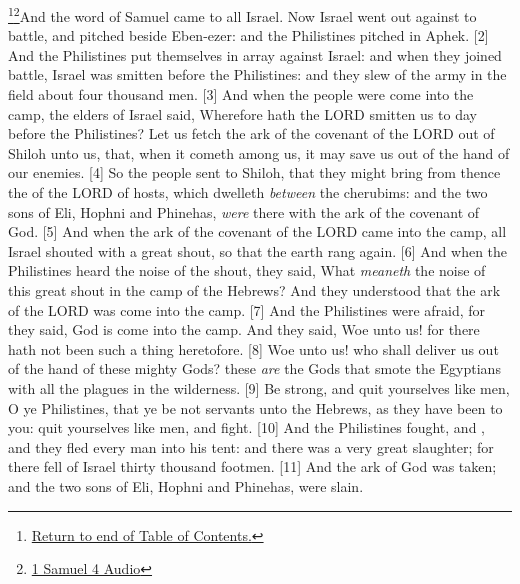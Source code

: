 \footnote{\textcolor[cmyk]{0.99998,1,0,0}{\hyperlink{TOC}{Return to end of Table of Contents.}}}\footnote{\href{https://audiobible.com/bible/1_samuel_4.html}{\textcolor[cmyk]{0.99998,1,0,0}{1 Samuel 4 Audio}}}\textcolor[cmyk]{0.99998,1,0,0}{And the word of Samuel came to all Israel. Now Israel went out against   to battle, and pitched beside Eben-ezer: and the Philistines pitched in Aphek.}
[2] \textcolor[cmyk]{0.99998,1,0,0}{And the Philistines put themselves in array against Israel: and when they joined battle, Israel was smitten before the Philistines: and they slew of the army in the field about four thousand men.}
[3] \textcolor[cmyk]{0.99998,1,0,0}{And when the people were come into the camp, the elders of Israel said, Wherefore hath the LORD smitten us to day before the Philistines? Let us fetch the ark of the covenant of the LORD out of Shiloh unto us, that, when it cometh among us, it may save us out of the hand of our enemies.}
[4] \textcolor[cmyk]{0.99998,1,0,0}{So the people sent to Shiloh, that they might bring from thence the  of the LORD of hosts, which dwelleth \emph{between} the cherubims: and the two sons of Eli, Hophni and Phinehas, \emph{were} there with the ark of the covenant of God.}
[5] \textcolor[cmyk]{0.99998,1,0,0}{And when the ark of the covenant of the LORD came into the camp, all Israel shouted with a great shout, so that the earth rang again.}
[6] \textcolor[cmyk]{0.99998,1,0,0}{And when the Philistines heard the noise of the shout, they said, What \emph{meaneth} the noise of this great shout in the camp of the Hebrews? And they understood that the ark of the LORD was come into the camp.}
[7] \textcolor[cmyk]{0.99998,1,0,0}{And the Philistines were afraid, for they said, God is come into the camp. And they said, Woe unto us! for there hath not been such a thing heretofore.}
[8] \textcolor[cmyk]{0.99998,1,0,0}{Woe unto us! who shall deliver us out of the hand of these mighty Gods? these \emph{are} the Gods that smote the Egyptians with all the plagues in the wilderness.}
[9] \textcolor[cmyk]{0.99998,1,0,0}{Be strong, and quit yourselves like men, O ye Philistines, that ye be not servants unto the Hebrews, as they have been to you: quit yourselves like men, and fight.}
[10] \textcolor[cmyk]{0.99998,1,0,0}{And the Philistines fought, and , and they fled every man into his tent: and there was a very great slaughter; for there fell of Israel thirty thousand footmen.}
[11] \textcolor[cmyk]{0.99998,1,0,0}{And the ark of God was taken; and the two sons of Eli, Hophni and Phinehas, were slain.}
